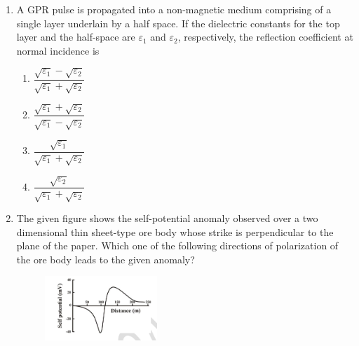 \documentclass[journal,12pt,onecolumn]{IEEEtran}
\begin{document}
\begin{enumerate}
\item A GPR pulse is propagated into a non-magnetic medium comprising of a single layer underlain by a half space. If the dielectric constants for the top layer and the half-space are $\varepsilon_1$ and $\varepsilon_2$, respectively, the reflection coefficient at normal incidence is  

\hfill{}

\begin{multicols}{2}
\begin{enumerate}
\item $\dfrac{\sqrt{\varepsilon_1} - \sqrt{\varepsilon_2}}{\sqrt{\varepsilon_1} + \sqrt{\varepsilon_2}}$
\item $\dfrac{\sqrt{\varepsilon_1} + \sqrt{\varepsilon_2}}{\sqrt{\varepsilon_1} - \sqrt{\varepsilon_2}}$
\item $\dfrac{\sqrt{\varepsilon_1}}{\sqrt{\varepsilon_1} + \sqrt{\varepsilon_2}}$
\item $\dfrac{\sqrt{\varepsilon_2}}{\sqrt{\varepsilon_1} + \sqrt{\varepsilon_2}}$
\end{enumerate}
\end{multicols}

\item The given figure shows the self-potential anomaly observed over a two dimensional thin sheet-type ore body whose strike is perpendicular to the plane of the paper. Which one of the following directions of polarization of the ore body leads to the given anomaly?  

\begin{figure}[h!]
    \centering
    \includegraphics[width=0.4\textwidth]{figs/fig5.png}
    \caption{}
    \label{fig:q18}
\end{figure}


\hfill{}



\end{enumerate}
\end{document}
